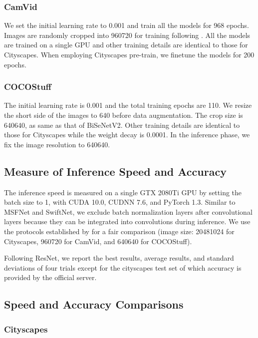 \documentclass[journal]{IEEEtran}
\begin{document}
\subsubsection{CamVid}

We set the initial learning rate to 0.001 and train all the models for 968 epochs. Images are randomly cropped into 960720 for training following \cite{li2019dfanet}. All the models are trained on a single GPU and other training details are identical to those for Cityscapes. When employing Cityscapes pre-train, we finetune the models for 200 epochs.

\subsubsection{COCOStuff}

The initial learning rate is 0.001 and the total training epochs are 110. We resize the short side of the images to 640 before data augmentation. The crop size is 640640, as same as that of BiSeNetV2\cite{yu2020bisenet}. Other training details are identical to those for Cityscapes while the weight decay is 0.0001. In the inference phase, we fix the image resolution to 640640.

\subsection{Measure of Inference Speed and Accuracy}

The inference speed is measured on a single GTX 2080Ti GPU by setting the batch size to 1, with CUDA 10.0, CUDNN 7.6, and PyTorch 1.3. Similar to MSFNet and SwiftNet, we exclude batch normalization layers after convolutional layers because they can be integrated into convolutions during inference. We use the protocols established by \cite{chen2019fasterseg} for a fair comparison (image size: 20481024 for Cityscapes, 960720 for CamVid, and 640640 for COCOStuff).

Following ResNet\cite{he2016deep}, we report the best results, average results, and standard deviations of four trials except for the cityscapes test set of which accuracy is provided by the official server.

\subsection{Speed and Accuracy Comparisons}

\subsubsection{Cityscapes}
\end{document}
